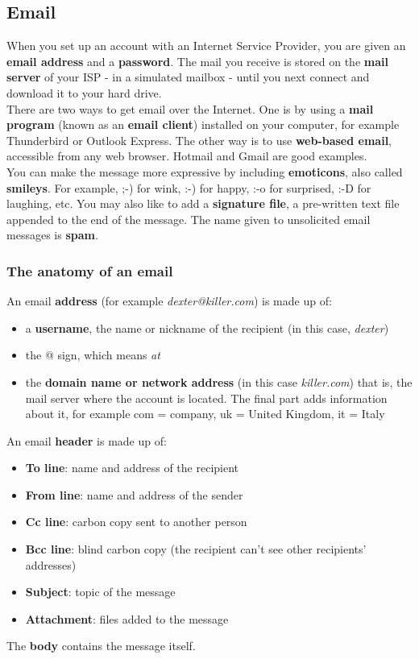 \documentclass[a4paper,8pt]{article}
\begin{document}
\subsection{Email}
When you set up an account with an Internet Service Provider, you are given an
\textbf{email address} and a \textbf{password}. The mail you receive is stored on
the \textbf{mail server} of your ISP - in a simulated mailbox - until
you next connect and download it to your hard drive.\\
There are two ways to get email over the Internet. One is by using a \textbf{mail program}
(known as an \textbf{email client}) installed on your computer, for example Thunderbird or
Outlook Express. The other way is to use \textbf{web-based email}, accessible from any
web browser. Hotmail and Gmail are good examples.\\
You can make the message more expressive by including \textbf{emoticons}, also called
\textbf{smileys}. For example, ;-) for wink, :-) for happy, :-o for surprised, :-D for
laughing, etc. You may also like to add a \textbf{signature file}, a pre-written text file
appended to the end of the message. The name given to unsolicited email messages is \textbf{spam}.
\subsubsection{The anatomy of an email}
An email \textbf{address} (for example \emph{dexter@killer.com}) is made up of:
\begin{itemize}
\item a \textbf{username}, the name or nickname of the recipient (in this case, \emph{dexter})
\item the @ sign, which means \emph{at}
\item the \textbf{domain name \textnormal{or} network address} (in this case \emph{killer.com})
that is, the mail server where the account is located. The final part adds information about it, for example
com = company, uk = United Kingdom, it = Italy
\end{itemize}
An email \textbf{header} is made up of:
\begin{itemize}
\item \textbf{To line}: name and address of the recipient
\item \textbf{From line}: name and address of the sender
\item \textbf{Cc line}: carbon copy sent to another person
\item \textbf{Bcc line}: blind carbon copy (the recipient can't see other recipients' addresses)
\item \textbf{Subject}: topic of the message
\item \textbf{Attachment}: files added to the message
\end{itemize}
The \textbf{body} contains the message itself.
\newpage
\end{document}
